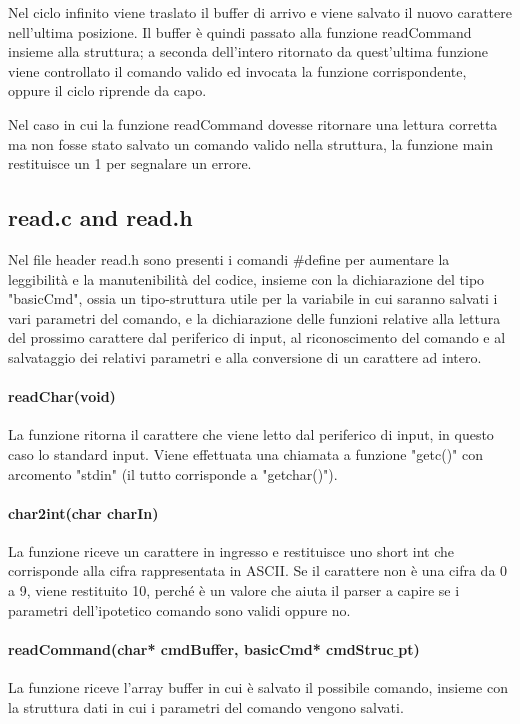 \documentclass{article}
\begin{document}
		Nel ciclo infinito viene traslato il buffer di arrivo e viene salvato il nuovo carattere nell'ultima
		posizione.
		Il buffer è quindi passato alla funzione readCommand insieme alla struttura; a seconda dell'intero
		ritornato da quest'ultima funzione viene controllato il comando valido ed invocata la funzione 
		corrispondente, oppure il ciclo riprende da capo.

		Nel caso in cui la funzione readCommand dovesse ritornare una lettura corretta ma non fosse stato
		salvato un comando valido nella struttura, la funzione main restituisce un 1 per segnalare un errore.
	\subsection{read.c and read.h}
		Nel file header read.h sono presenti i comandi $\#$define per aumentare la leggibilità e la manutenibilità
		del codice, insieme con la dichiarazione del tipo "basicCmd", ossia un tipo-struttura  utile per la variabile
		in cui saranno salvati i vari parametri del comando, e la dichiarazione delle funzioni relative alla
		lettura del prossimo carattere dal periferico di input, al riconoscimento del comando e al salvataggio
		dei relativi parametri e alla conversione di un carattere ad intero. 
		\paragraph{readChar(void)}
			La funzione ritorna il carattere che viene letto dal periferico di input, in questo caso lo standard input.
			Viene effettuata una chiamata a funzione "getc()" con arcomento "stdin" (il tutto corrisponde a "getchar()").
		\paragraph{char2int(char charIn)}
			La funzione riceve un carattere in ingresso e restituisce uno short int che corrisponde alla cifra 
			rappresentata in ASCII. Se il carattere non è una cifra da 0 a 9, viene restituito 10, perché è un
			valore che aiuta il parser a capire se i parametri dell'ipotetico comando sono validi oppure no.
		\paragraph{readCommand(char* cmdBuffer, basicCmd* cmdStruc$\_$pt)}
			La funzione riceve l'array buffer in cui è salvato il possibile comando, insieme con la struttura dati in
			cui i parametri del comando vengono salvati.
\end{document}
